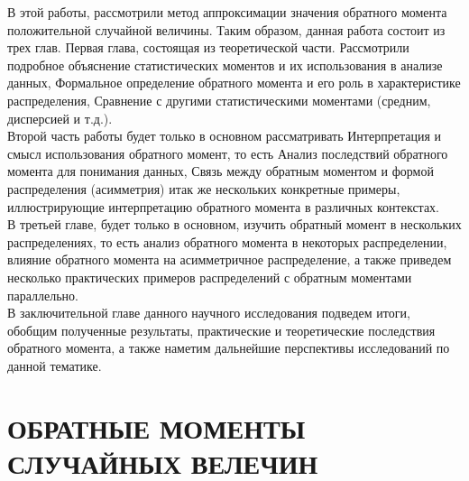 \documentclass[13pt]{article}
\begin{document}
В этой работы, рассмотрили метод аппроксимации значения обратного момента положительной случайной величины. Таким образом, данная работа состоит из трех глав. Первая глава, состоящая из теоретической части. Рассмотрили подробное объяснение статистических моментов и их использования в анализе данных, Формальное определение обратного момента и его роль в характеристике распределения, Сравнение с другими статистическими моментами (средним, дисперсией и т.д.).\\
Второй часть работы будет только в основном рассматривать Интерпретация и смысл использования обратного момент, то есть Анализ последствий обратного момента для понимания данных, Связь между обратным моментом и формой распределения (асимметрия) итак же нескольких конкретные примеры, иллюстрирующие интерпретацию обратного момента в различных контекстах.\\
В третьей главе, будет только в основном, изучить обратный момент в нескольких распределениях, то есть анализ обратного момента в некоторых распределении, влияние обратного момента на асимметричное распределение, а также приведем несколько практических примеров распределений с обратным моментами параллельно.\\
В заключительной главе данного научного исследования подведем итоги, обобщим полученные результаты, практические и теоретические последствия обратного момента, а также наметим дальнейшие перспективы исследований по данной тематике.
 

\newpage
\section*{ОБРАТНЫЕ МОМЕНТЫ СЛУЧАЙНЫХ ВЕЛЕЧИН}\label{section 1}
\end{document}
